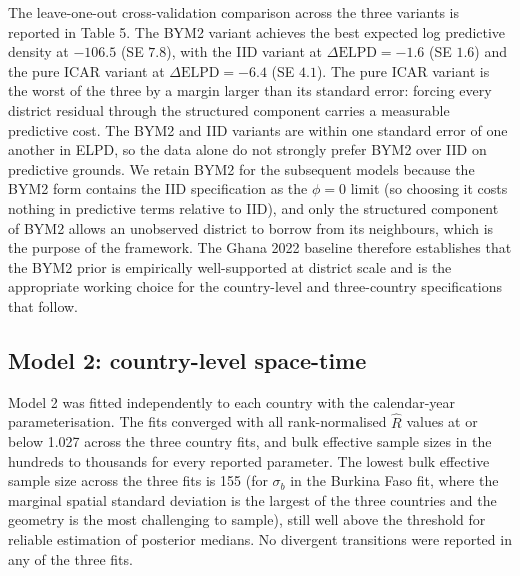\documentclass{article}
\begin{document}
The leave-one-out cross-validation comparison across the three variants
is reported in Table 5. The BYM2 variant achieves the best expected log
predictive density at \(-106.5\) (SE \(7.8\)), with the IID variant at
\(\Delta\text{ELPD} = -1.6\) (SE \(1.6\)) and the pure ICAR variant at
\(\Delta\text{ELPD} = -6.4\) (SE \(4.1\)). The pure ICAR variant is the
worst of the three by a margin larger than its standard error: forcing
every district residual through the structured component carries a
measurable predictive cost. The BYM2 and IID variants are within one
standard error of one another in ELPD, so the data alone do not strongly
prefer BYM2 over IID on predictive grounds. We retain BYM2 for the
subsequent models because the BYM2 form contains the IID specification
as the \(\phi = 0\) limit (so choosing it costs nothing in predictive
terms relative to IID), and only the structured component of BYM2 allows
an unobserved district to borrow from its neighbours, which is the
purpose of the framework. The Ghana 2022 baseline therefore establishes
that the BYM2 prior is empirically well-supported at district scale and
is the appropriate working choice for the country-level and
three-country specifications that follow.

\subsection{Model 2: country-level
space-time}\label{model-2-country-level-space-time}

Model 2 was fitted independently to each country with the calendar-year
parameterisation. The fits converged with all rank-normalised
\(\hat{R}\) values at or below 1.027 across the three country fits, and
bulk effective sample sizes in the hundreds to thousands for every
reported parameter. The lowest bulk effective sample size across the
three fits is 155 (for \(\sigma_b\) in the Burkina Faso fit, where the
marginal spatial standard deviation is the largest of the three
countries and the geometry is the most challenging to sample), still
well above the threshold for reliable estimation of posterior medians.
No divergent transitions were reported in any of the three fits.
\end{document}
